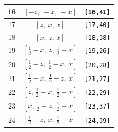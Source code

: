 \documentclass[fleqn,8pt]{jsarticle}
\begin{document}
\begin{longtable}{ccc}
16 & $\left[ - z,\, - x,\, - x \right]$ & {\tt [16,41]} \\ \hline
17 & $\left[ z,\, x,\, x \right]$ & {\tt [17,40]} \\ \hline
18 & $\left[ x,\, z,\, x \right]$ & {\tt [18,38]} \\ \hline
19 & $\left[ \frac{1}{2} - x,\, z,\, \frac{1}{2} - x \right]$ & {\tt [19,26]} \\ \hline
20 & $\left[ \frac{1}{2} - z,\, \frac{1}{2} - x,\, x \right]$ & {\tt [20,28]} \\ \hline
21 & $\left[ \frac{1}{2} - x,\, \frac{1}{2} - z,\, x \right]$ & {\tt [21,27]} \\ \hline
22 & $\left[ z,\, \frac{1}{2} - x,\, \frac{1}{2} - x \right]$ & {\tt [22,29]} \\ \hline
23 & $\left[ x,\, \frac{1}{2} - z,\, \frac{1}{2} - x \right]$ & {\tt [23,37]} \\ \hline
24 & $\left[ \frac{1}{2} - z,\, x,\, \frac{1}{2} - x \right]$ & {\tt [24,39]} \\
\end{longtable}
\renewcommand{\arraystretch}{1.2}
\end{document}
